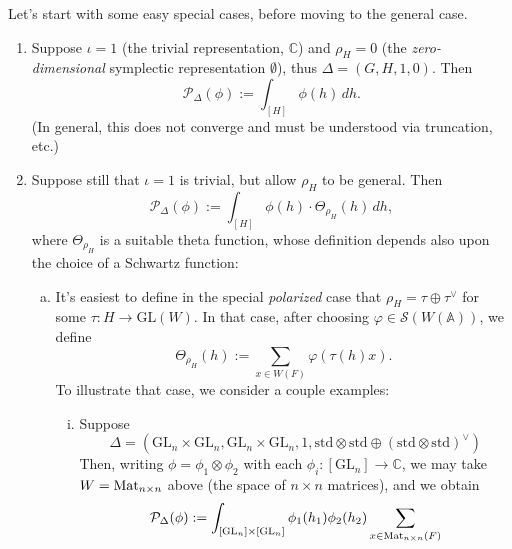 \documentclass[reqno]{amsart} 
\numberwithin{theorem}{section}
\numberwithin{equation}{section}
\numberwithin{exercise}{section}
\begin{document}
Let's start with some easy special cases, before moving to the general case.
\begin{enumerate}
\item\label{enumerate:cq6tg85st6} Suppose $\iota = 1$ (the trivial representation, $\mathbb{C}$) and $\rho_H = 0$ (the \emph{zero-dimensional} symplectic representation $\emptyset$), thus $\Delta =(G, H, 1, 0)$.  Then
  \begin{equation*}
    \mathcal{P}_\Delta(\phi) := \int_{[H]} \phi(h) \, d h.
  \end{equation*}
  (In general, this does not converge and must be understood via truncation, etc.)
\item\label{enumerate:cq6tg85t0e} Suppose still that $\iota = 1$ is trivial, but allow $\rho_H$ to be general.  Then
  \begin{equation*}
    \mathcal{P}_\Delta(\phi) := \int_{[H]} \phi(h) \cdot \Theta_{\rho_H}(h) \, d h,
  \end{equation*}
  where $\Theta_{\rho_H}$ is a suitable theta function, whose definition depends also upon the choice of a Schwartz function:
  \begin{enumerate}[(a)]
  \item\label{enumerate:cq6thb0l6i} It's easiest to define in the special \emph{polarized} case that $\rho_H = \tau \oplus \tau^\vee$ for some $\tau : H \rightarrow\mathrm{GL}(W)$.  In that case, after choosing $\varphi \in \mathcal{S}(W(\mathbb{A}))$, we define
    \begin{equation*}
      \Theta_{\rho_H}(h) := \sum_{x \in W(F)} \varphi(\tau(h) x).
    \end{equation*}
    To illustrate that case, we consider a couple examples:
    \begin{enumerate}[(i)]
    \item\label{enumerate:cq6thb0n66} Suppose
      \begin{equation*}
        \Delta =(\mathrm{GL}_n \times \mathrm{GL}_n, \mathrm{GL}_n \times \mathrm{GL}_n, 1, \mathrm{std} \otimes \mathrm{std \oplus(\mathrm{std} \otimes \mathrm{std})^\vee})
      \end{equation*}
      Then, writing $\phi = \phi_1 \otimes \phi_2$ with each $\phi_i :[\mathrm{GL}_n] \rightarrow \mathbb{C}$, we may take $W = \operatorname{Mat}_{n \times n}$ above (the space of $n \times n$ matrices), and we obtain
      \begin{equation*}
        \mathcal{P}_\Delta(\phi) := \int_{[\mathrm{GL}_n] \times[\mathrm{GL}_n]} \phi_1(h_1) \phi_2(h_2) \sum_{x \in \Mat_{n \times n}(F)}

\end{equation*}
\end{enumerate}
\end{enumerate}
\end{enumerate}
\end{document}

